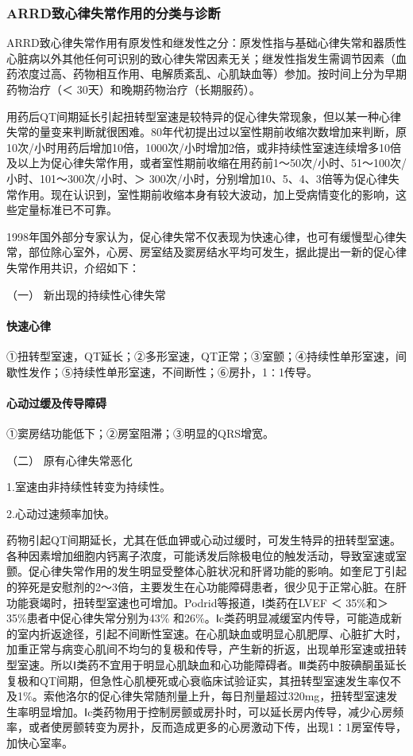 \subsubsection{ARRD致心律失常作用的分类与诊断}

ARRD致心律失常作用有原发性和继发性之分：原发性指与基础心律失常和器质性心脏病以外其他任何可识别的致心律失常因素无关；继发性指发生需调节因素（血药浓度过高、药物相互作用、电解质紊乱、心肌缺血等）参加。按时间上分为早期药物治疗（＜
30天）和晚期药物治疗（长期服药）。

用药后QT间期延长引起扭转型室速是较特异的促心律失常现象，但以某一种心律失常的量变来判断就很困难。80年代初提出过以室性期前收缩次数增加来判断，原10次/小时用药后增加10倍，1000次/小时增加2倍，或非持续性室速连续增多10倍及以上为促心律失常作用，或者室性期前收缩在用药前1～50次/小时、51～100次/小时、101～300次/小时、＞
300次/小时，分别增加10、5、4、3倍等为促心律失常作用。现在认识到，室性期前收缩本身有较大波动，加上受病情变化的影响，这些定量标准已不可靠。

1998年国外部分专家认为，促心律失常不仅表现为快速心律，也可有缓慢型心律失常，部位除心室外，心房、房室结及窦房结水平均可发生，据此提出一新的促心律失常作用共识，介绍如下：

\hypertarget{text00423.htmlux5cux23CHP17-4-5-2-1}{}
（一） 新出现的持续性心律失常

\paragraph{快速心律}

①扭转型室速，QT延长；②多形室速，QT正常；③室颤；④持续性单形室速，间歇性发作；⑤持续性单形室速，不间断性；⑥房扑，1∶1传导。

\paragraph{心动过缓及传导障碍}

①窦房结功能低下；②房室阻滞；③明显的QRS增宽。

\hypertarget{text00423.htmlux5cux23CHP17-4-5-2-2}{}
（二） 原有心律失常恶化

1.室速由非持续性转变为持续性。

2.心动过速频率加快。

药物引起QT间期延长，尤其在低血钾或心动过缓时，可发生特异的扭转型室速。各种因素增加细胞内钙离子浓度，可能诱发后除极电位的触发活动，导致室速或室颤。促心律失常作用的发生明显受整体心脏状况和肝肾功能的影响。如奎尼丁引起的猝死是安慰剂的2～3倍，主要发生在心功能障碍患者，很少见于正常心脏。在肝功能衰竭时，扭转型室速也可增加。Podrid等报道，Ⅰ类药在LVEF
＜ 35\%和＞ 35\%患者中促心律失常分别为43\%
和26\%。Ⅰc类药明显减缓室内传导，可能造成新的室内折返途径，引起不间断性室速。在心肌缺血或明显心肌肥厚、心脏扩大时，加重正常与病变心肌间不均匀的复极和传导，产生新的折返，出现单形室速或扭转型室速。所以Ⅰ类药不宜用于明显心肌缺血和心功能障碍者。Ⅲ类药中胺碘酮虽延长复极和QT间期，但急性心肌梗死或心衰临床试验证实，其扭转型室速发生率仅不及1\%。索他洛尔的促心律失常随剂量上升，每日剂量超过320mg，扭转型室速发生率明显增加。Ⅰc类药物用于控制房颤或房扑时，可以延长房内传导，减少心房频率，或者使房颤转变为房扑，反而造成更多的心房激动下传，出现1∶1房室传导，加快心室率。

